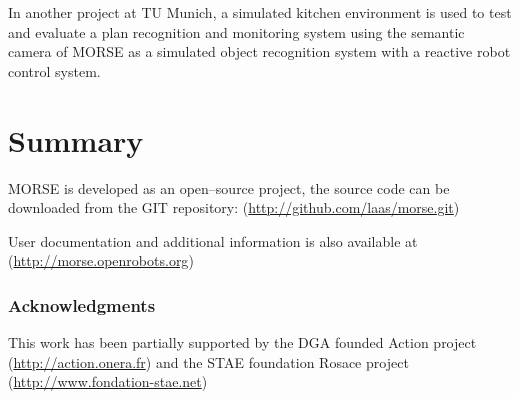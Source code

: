 \documentclass{llncs}
\begin{document}
In another project at TU Munich, a simulated kitchen environment is used
to test and evaluate a plan recognition and monitoring system using the 
semantic camera of MORSE as a simulated object recognition system with 
a reactive robot control system.


\section{Summary}
\label{section:discussion}


MORSE is developed as an open--source project, the source code can be
downloaded from the GIT repository:
(\url{http://github.com/laas/morse.git})

User documentation and additional information is also available at
(\url{http://morse.openrobots.org})


\subsubsection*{Acknowledgments}
This work has been partially supported by the DGA founded Action project
(\url{http://action.onera.fr}) and the STAE foundation Rosace project
(\url{http://www.fondation-stae.net})



\end{document}
